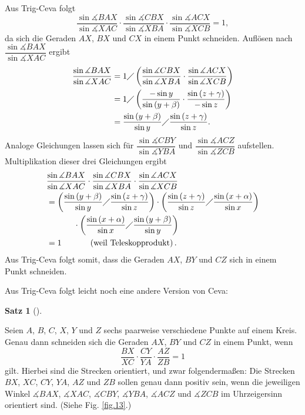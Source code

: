 \documentclass[12pt,final,notitlepage,onecolumn,german]{article}%
\theoremstyle{definition}
\newtheorem{theo}{Satz}[section]
\newenvironment{theorem}[1][]
{\begin{theo}[#1]\begin{leftbar}}
{\end{leftbar}\end{theo}}
\theoremstyle{plainsl}
\begin{document}
Aus Trig-Ceva folgt%
\[
\dfrac{\sin\measuredangle BAX}{\sin\measuredangle XAC}\cdot\dfrac
{\sin\measuredangle CBX}{\sin\measuredangle XBA}\cdot\dfrac{\sin\measuredangle
ACX}{\sin\measuredangle XCB}=1,
\]
da sich die Geraden $AX$, $BX$ und $CX$ in einem Punkt schneiden. Aufl\"{o}sen
nach $\dfrac{\sin\measuredangle BAX}{\sin\measuredangle XAC}$ ergibt%
\begin{align*}
\dfrac{\sin\measuredangle BAX}{\sin\measuredangle XAC}  &  =1\diagup\left(
\dfrac{\sin\measuredangle CBX}{\sin\measuredangle XBA}\cdot\dfrac
{\sin\measuredangle ACX}{\sin\measuredangle XCB}\right) \\
&  =1\diagup\left(  \dfrac{-\sin y}{\sin\left(  y+\beta\right)  }\cdot
\dfrac{\sin\left(  z+\gamma\right)  }{-\sin z}\right) \\
&  =\dfrac{\sin\left(  y+\beta\right)  }{\sin y}\diagup\dfrac{\sin\left(
z+\gamma\right)  }{\sin z}.
\end{align*}
Analoge Gleichungen lassen sich f\"{u}r $\dfrac{\sin\measuredangle CBY}%
{\sin\measuredangle YBA}$ und $\dfrac{\sin\measuredangle ACZ}{\sin
\measuredangle ZCB}$ aufstellen. Multiplikation dieser drei Gleichungen
ergibt
\begin{align*}
&  \dfrac{\sin\measuredangle BAX}{\sin\measuredangle XAC}\cdot\dfrac
{\sin\measuredangle CBX}{\sin\measuredangle XBA}\cdot\dfrac{\sin\measuredangle
ACX}{\sin\measuredangle XCB}\\
&  =\left(  \dfrac{\sin\left(  y+\beta\right)  }{\sin y}\diagup\dfrac
{\sin\left(  z+\gamma\right)  }{\sin z}\right)  \cdot\left(  \dfrac
{\sin\left(  z+\gamma\right)  }{\sin z}\diagup\dfrac{\sin\left(
x+\alpha\right)  }{\sin x}\right) \\
&  \ \ \ \ \ \ \ \ \ \ \cdot\left(  \dfrac{\sin\left(  x+\alpha\right)  }{\sin
x}\diagup\dfrac{\sin\left(  y+\beta\right)  }{\sin y}\right) \\
&  =1\ \ \ \ \ \ \ \ \ \ \left(  \text{weil Teleskopprodukt}\right)  .
\end{align*}
Aus Trig-Ceva folgt somit, dass die Geraden $AX$, $BY$ und $CZ$ sich in einem
Punkt schneiden.

Aus Trig-Ceva folgt leicht noch eine andere Version von Ceva:

\begin{theorem}
[Satz von Ceva auf dem Kreis]\label{thm.kreisceva}Seien $A$, $B$, $C$, $X$,
$Y$ und $Z$ sechs paarweise verschiedene Punkte auf einem Kreis. Genau dann
schneiden sich die Geraden $AX$, $BY$ und $CZ$ in einem Punkt, wenn%
\[
\dfrac{BX}{XC}\cdot\dfrac{CY}{YA}\cdot\dfrac{AZ}{ZB}=1
\]
gilt. Hierbei sind die Strecken orientiert, und zwar folgenderma\ss en: Die
Strecken $BX$, $XC$, $CY$, $YA$, $AZ$ und $ZB$ sollen genau dann positiv sein,
wenn die jeweiligen Winkel $\measuredangle BAX$, $\measuredangle XAC$,
$\measuredangle CBY$, $\measuredangle YBA$, $\measuredangle ACZ$ und
$\measuredangle ZCB$ im Uhrzeigersinn orientiert sind. (Siehe Fig.
\ref{fig.13}.)
\end{theorem}
\end{document}
